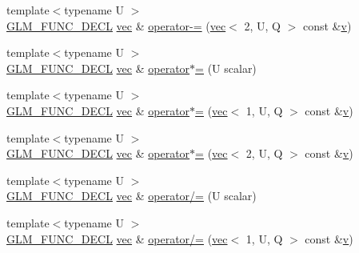 \begin{DoxyCompactItemize}
\item 
{\footnotesize template$<$typename U $>$ }\\\hyperlink{setup_8hpp_ab2d052de21a70539923e9bcbf6e83a51}{G\+L\+M\+\_\+\+F\+U\+N\+C\+\_\+\+D\+E\+CL} \hyperlink{structglm_1_1vec}{vec} \& \hyperlink{structglm_1_1vec_3_012_00_01_t_00_01_q_01_4_a8051ed9c25b34e08a29f6eee8d0ea3dc}{operator-\/=} (\hyperlink{structglm_1_1vec}{vec}$<$ 2, U, Q $>$ const \&\hyperlink{_s_d_l__opengl_8h_a10a82eabcb59d2fcd74acee063775f90}{v})
\item 
{\footnotesize template$<$typename U $>$ }\\\hyperlink{setup_8hpp_ab2d052de21a70539923e9bcbf6e83a51}{G\+L\+M\+\_\+\+F\+U\+N\+C\+\_\+\+D\+E\+CL} \hyperlink{structglm_1_1vec}{vec} \& \hyperlink{structglm_1_1vec_3_012_00_01_t_00_01_q_01_4_a4a645fcc1832d33c8be9c5dfcb4107e8}{operator$\ast$=} (U scalar)
\item 
{\footnotesize template$<$typename U $>$ }\\\hyperlink{setup_8hpp_ab2d052de21a70539923e9bcbf6e83a51}{G\+L\+M\+\_\+\+F\+U\+N\+C\+\_\+\+D\+E\+CL} \hyperlink{structglm_1_1vec}{vec} \& \hyperlink{structglm_1_1vec_3_012_00_01_t_00_01_q_01_4_acf5a22f65506ef65ad1183416e0ea077}{operator$\ast$=} (\hyperlink{structglm_1_1vec}{vec}$<$ 1, U, Q $>$ const \&\hyperlink{_s_d_l__opengl_8h_a10a82eabcb59d2fcd74acee063775f90}{v})
\item 
{\footnotesize template$<$typename U $>$ }\\\hyperlink{setup_8hpp_ab2d052de21a70539923e9bcbf6e83a51}{G\+L\+M\+\_\+\+F\+U\+N\+C\+\_\+\+D\+E\+CL} \hyperlink{structglm_1_1vec}{vec} \& \hyperlink{structglm_1_1vec_3_012_00_01_t_00_01_q_01_4_ac151d57702d8baed4fa936dc7a39cc15}{operator$\ast$=} (\hyperlink{structglm_1_1vec}{vec}$<$ 2, U, Q $>$ const \&\hyperlink{_s_d_l__opengl_8h_a10a82eabcb59d2fcd74acee063775f90}{v})
\item 
{\footnotesize template$<$typename U $>$ }\\\hyperlink{setup_8hpp_ab2d052de21a70539923e9bcbf6e83a51}{G\+L\+M\+\_\+\+F\+U\+N\+C\+\_\+\+D\+E\+CL} \hyperlink{structglm_1_1vec}{vec} \& \hyperlink{structglm_1_1vec_3_012_00_01_t_00_01_q_01_4_aa8482a8ff3984a1cb04caf5e3e684f71}{operator/=} (U scalar)
\item 
{\footnotesize template$<$typename U $>$ }\\\hyperlink{setup_8hpp_ab2d052de21a70539923e9bcbf6e83a51}{G\+L\+M\+\_\+\+F\+U\+N\+C\+\_\+\+D\+E\+CL} \hyperlink{structglm_1_1vec}{vec} \& \hyperlink{structglm_1_1vec_3_012_00_01_t_00_01_q_01_4_ac08ebb38eeef819015ce62bf46fd1a8f}{operator/=} (\hyperlink{structglm_1_1vec}{vec}$<$ 1, U, Q $>$ const \&\hyperlink{_s_d_l__opengl_8h_a10a82eabcb59d2fcd74acee063775f90}{v})

\end{DoxyCompactItemize}

